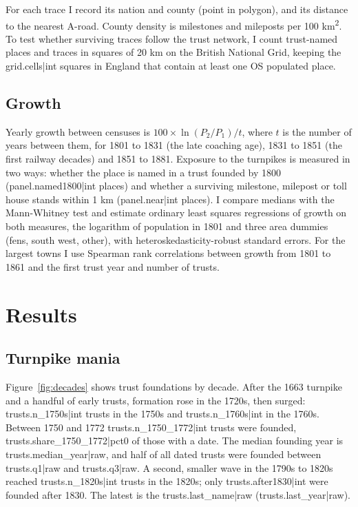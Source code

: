 \documentclass[11pt,a4paper]{article}
\begin{document}
For each trace I record its nation and county (point in polygon), and its distance to the nearest A-road. County density is milestones and mileposts per 100 km\textsuperscript{2}. To test whether surviving traces follow the trust network, I count trust-named places and traces in squares of 20 km on the British National Grid, keeping the {{grid.cells|int}} squares in England that contain at least one OS populated place.

\subsection{Growth}

Yearly growth between censuses is $100 \times \ln(P_2/P_1)/t$, where $t$ is the number of years between them, for 1801 to 1831 (the late coaching age), 1831 to 1851 (the first railway decades) and 1851 to 1881. Exposure to the turnpikes is measured in two ways: whether the place is named in a trust founded by 1800 ({{panel.named1800|int}} places) and whether a surviving milestone, milepost or toll house stands within 1 km ({{panel.near|int}} places). I compare medians with the Mann-Whitney test and estimate ordinary least squares regressions of growth on both measures, the logarithm of population in 1801 and three area dummies (fens, south west, other), with heteroskedasticity-robust standard errors. For the largest towns I use Spearman rank correlations between growth from 1801 to 1861 and the first trust year and number of trusts.

\section{Results}

\subsection{Turnpike mania}

Figure~\ref{fig:decades} shows trust foundations by decade. After the 1663 turnpike and a handful of early trusts, formation rose in the 1720s, then surged: {{trusts.n_1750s|int}} trusts in the 1750s and {{trusts.n_1760s|int}} in the 1760s. Between 1750 and 1772 {{trusts.n_1750_1772|int}} trusts were founded, {{trusts.share_1750_1772|pct0}} of those with a date. The median founding year is {{trusts.median_year|raw}}, and half of all dated trusts were founded between {{trusts.q1|raw}} and {{trusts.q3|raw}}. A second, smaller wave in the 1790s to 1820s reached {{trusts.n_1820s|int}} trusts in the 1820s; only {{trusts.after1830|int}} were founded after 1830. The latest is the {{trusts.last_name|raw}} ({{trusts.last_year|raw}}).
\end{document}
